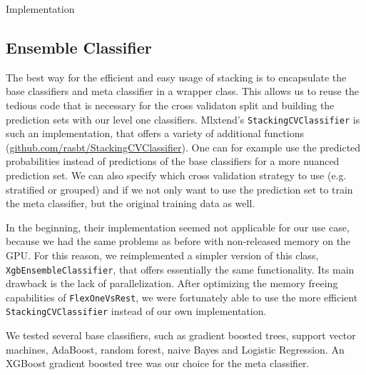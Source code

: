 \begin{section}{Implementation}
\subsection{Ensemble Classifier}

The best way for the efficient and easy usage of stacking is to encapsulate the base classifiers and meta classifier in a wrapper class. This allows us to reuse the tedious code that is necessary for the cross validaton split and building the prediction sets with our level one classifiers. Mlxtend's \texttt{StackingCVClassifier} is such an implementation, that offers a variety of additional functions (\href{http://rasbt.github.io/mlxtend/user_guide/classifier/StackingCVClassifier/}{github.com/rasbt/StackingCVClassifier}). One can for example use the predicted probabilities instead of predictions of the base classifiers for a more nuanced prediction set. We can also specify which cross validation strategy to use (e.g. stratified or grouped) and if we not only want to use the prediction set to train the meta classifier, but the original training data as well.

In the beginning, their implementation seemed not applicable for our use case, because we had the same problems as before with non-released memory on the GPU. For this reason, we reimplemented a simpler version of this class, \texttt{XgbEnsembleClassifier}, that offers essentially the same functionality. Its main drawback is the lack of parallelization. After optimizing the memory freeing capabilities of \texttt{FlexOneVsRest}, we were fortunately able to use the more efficient \texttt{StackingCVClassifier} instead of our own implementation.

We tested several base classifiers, such as gradient boosted trees, support vector machines, AdaBoost, random forest, naive Bayes and Logistic Regression. An XGBoost gradient boosted tree was our choice for the meta classifier.

\end{section}
